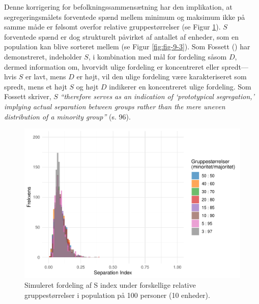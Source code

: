 \documentclass[
]{book}
\begin{document}
Denne korrigering for befolkningssammensætning har den implikation, at segregeringsmålets forventede spænd mellem minimum og maksimum ikke på samme måde er følsomt overfor relative gruppestørrelser (se Figur \ref{fig:fig-9-2}). \(S\) forventede spænd er dog strukturelt påvirket af antallet af enheder, som en population kan blive sorteret mellem (se Figur \ref{fig:fig-9-3}). Som Fossett () har demonstreret, indeholder \(S\), i kombination med mål for fordeling såsom \(D\), dermed information om, hvorvidt ulige fordeling er koncentreret eller spredt---hvis \(S\) er lavt, mens \(D\) er højt, vil den ulige fordeling være karakteriseret som spredt, mens et højt \(S\) og højt \(D\) indikerer en koncentreret ulige fordeling. Som Fossett skriver, \(S\) \emph{``therefore serves as an indication of `prototypical segregation,' implying actual separation between groups rather than the mere uneven distribution of a minority group''} (s. 96).

\begin{figure}
\includegraphics[width=1\linewidth]{en-befolkning-blander-sig_files/figure-latex/fig-9-2-1} \caption{Simuleret fordeling af S index under forskellige relative gruppestørrelser i population på 100 personer (10 enheder).}\label{fig:fig-9-2}
\end{figure}
\end{document}
